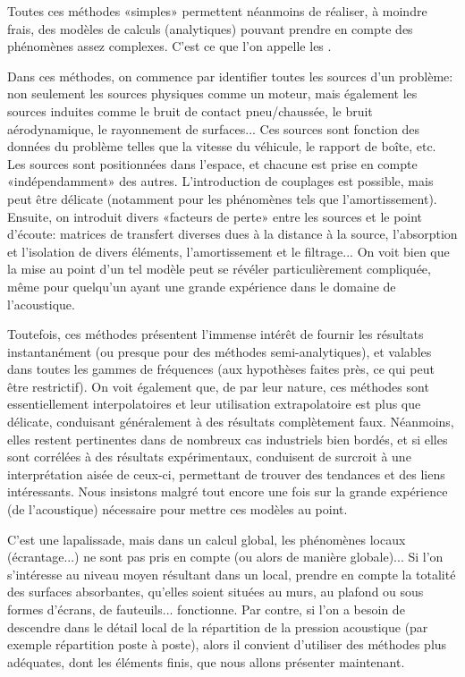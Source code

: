 \begin{remarque}
Toutes ces méthodes «simples» permettent néanmoins de réaliser, à moindre frais, des modèles de calculs (analytiques) pouvant prendre en compte des phénomènes assez complexes. C'est ce que l'on appelle les .

Dans ces méthodes, on commence par identifier toutes les sources d'un problème: non seulement les sources physiques comme un moteur, mais également les sources induites comme le bruit de contact pneu/chaussée, le bruit aérodynamique, le rayonnement de surfaces...
Ces sources sont fonction des données du problème telles que la vitesse du véhicule, le rapport de boîte, etc.
Les sources sont positionnées dans l'espace, et chacune est prise en compte «indépendamment» des autres. L'introduction de couplages est possible, mais peut être délicate (notamment pour les phénomènes tels que l'amortissement).
Ensuite, on introduit divers «facteurs de perte» entre les sources et le point d'écoute: matrices de transfert diverses dues à la distance à la source, l'absorption et l'isolation de divers éléments, l'amortissement et le filtrage...
On voit bien que la mise au point d'un tel modèle peut se révéler particulièrement compliquée, même pour quelqu'un ayant une grande expérience dans le domaine de l'acoustique.

Toutefois, ces méthodes présentent l'immense intérêt de fournir les résultats instantanément (ou presque pour des méthodes semi-analytiques), et valables dans toutes les gammes de fréquences (aux hypothèses faites près, ce qui peut être restrictif). On voit également que, de par leur nature, ces méthodes sont essentiellement interpolatoires et leur utilisation extrapolatoire est plus que délicate, conduisant généralement à des résultats complètement faux. Néanmoins, elles restent pertinentes dans de nombreux cas industriels bien bordés, et si elles sont corrélées à des résultats expérimentaux, conduisent de surcroit à une interprétation aisée de ceux-ci, permettant de trouver des tendances et des liens intéressants. Nous insistons malgré tout encore une fois sur la grande expérience (de l'acoustique) nécessaire pour mettre ces modèles au point.
\end{remarque}

C'est une lapalissade, mais dans un calcul global, les phénomènes locaux (écrantage...) ne sont pas pris en compte (ou alors de manière globale)...
Si l'on s'intéresse au niveau moyen résultant dans un local, prendre en compte la totalité des surfaces absorbantes, qu'elles soient situées au murs, au plafond ou sous formes d'écrans, de fauteuils... fonctionne.
Par contre, si l'on a besoin de descendre dans le détail local de la répartition de la pression acoustique (par exemple répartition poste à poste), alors il convient d'utiliser des méthodes plus adéquates, dont les éléments finis, que nous allons présenter maintenant.

